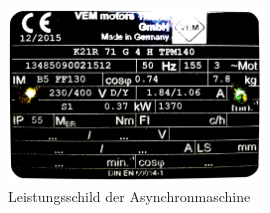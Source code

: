 \chapter{}

\section{}

\section{}

\section{}
\begin{figure}[h]
	\centering
	\includegraphics[width=0.6\textwidth]{./Bilder/Typenschild.png}
	\caption{Leistungsschild der Asynchronmaschine}
	\label{fig:4c:typenschild}
\end{figure}